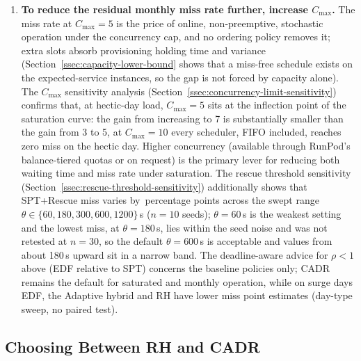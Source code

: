 {\begin{enumerate}
  \item \textbf{To reduce the residual monthly miss rate further, increase $C_{\max}$.} The miss rate at $C_{\max}=5$ is the price of online, non-preemptive, stochastic operation under the concurrency cap, and no ordering policy removes it; extra slots absorb provisioning holding time and variance (Section~\ref{ssec:capacity-lower-bound} shows that a miss-free schedule exists on the expected-service instances, so the gap is not forced by capacity alone). The $C_{\max}$ sensitivity analysis (Section~\ref{ssec:concurrency-limit-sensitivity}) confirms that, at hectic-day load, $C_{\max}=5$ sits at the inflection point of the saturation curve: the gain from increasing to 7 is substantially smaller than the gain from 3 to 5, at $C_{\max}=10$ every scheduler, FIFO included, reaches zero miss on the hectic day. Higher concurrency (available through RunPod's balance-tiered quotas or on request) is the primary lever for reducing both waiting time and miss rate under saturation. The rescue threshold sensitivity (Section~\ref{ssec:rescue-threshold-sensitivity}) additionally shows that SPT+Rescue miss varies by \ThrMissSpread\,percentage points across the swept range $\theta \in \{60, 180, 300, 600, 1200\}$\,s ($n=10$ seeds); $\theta=60$\,s is the weakest setting and the lowest miss, at $\theta=180$\,s, lies within the seed noise and was not retested at $n=30$, so the default $\theta=600$\,s is acceptable and values from about 180\,s upward sit in a narrow band. The deadline-aware advice for $\rho<1$ above (EDF relative to SPT) concerns the baseline policies only; CADR remains the default for saturated and monthly operation, while on surge days EDF, the Adaptive hybrid and RH have lower miss point estimates (day-type sweep, no paired test).
\end{enumerate}

\subsection{Choosing Between RH and CADR}
\label{ssec:choosing-between-rh-and-cadr}

}
